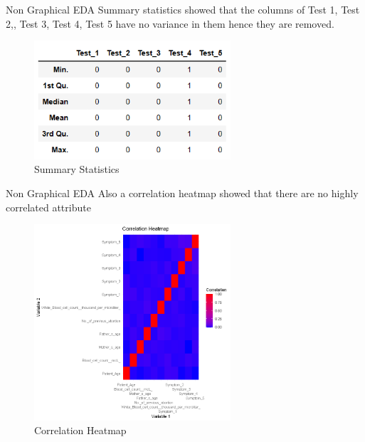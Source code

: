 \documentclass{beamer}
\begin{document}
	\begin{frame}{Non Graphical EDA}
		Summary statistics showed that the columns of Test 1, Test 2,, Test 3, Test 4, Test 5 have no variance in them hence they are removed.
		\begin{figure}
			\includegraphics[width=0.65\textwidth, height=0.6\textheight]{s_stat.png}
			\caption{Summary Statistics}
		\end{figure}
	\end{frame}
	\begin{frame}{Non Graphical EDA}
		Also a correlation heatmap showed that there are no highly correlated attribute
		\begin{figure}
			\includegraphics[width=0.65\textwidth, height=0.6\textheight]{corr.png}
			\caption{Correlation Heatmap}
		\end{figure}
	\end{frame}
\end{document}
